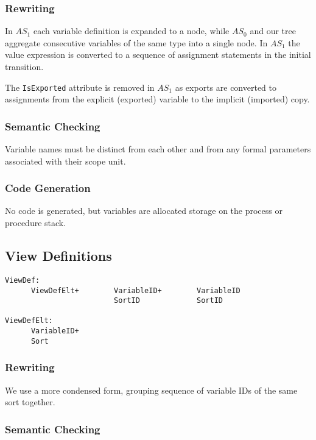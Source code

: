 \subsubsection{Rewriting}

In $AS_1$ each variable definition is expanded to a node, while
$AS_0$ and our tree aggregate consecutive variables of the same type
into a single node.
In $AS_1$ the value expression is converted to
a sequence of assignment statements in the initial transition.

The {\tt IsExported} attribute is removed in $AS_1$ as exports are
converted to assignments from the explicit (exported) variable
to the implicit (imported) copy.

\subsubsection{Semantic Checking}

Variable names must be distinct from each other and from any formal
parameters associated with their scope unit.

\subsubsection{Code Generation}

No code is generated, but variables are allocated storage on the
process or procedure stack.

\subsection{View Definitions}

\begin{verbatim}
ViewDef:
      ViewDefElt+        VariableID+        VariableID
                         SortID             SortID

ViewDefElt:
      VariableID+
      Sort
\end{verbatim}

\subsubsection{Rewriting}

We use a more condensed form, grouping sequence of variable IDs of
the same sort together.

\subsubsection{Semantic Checking}

